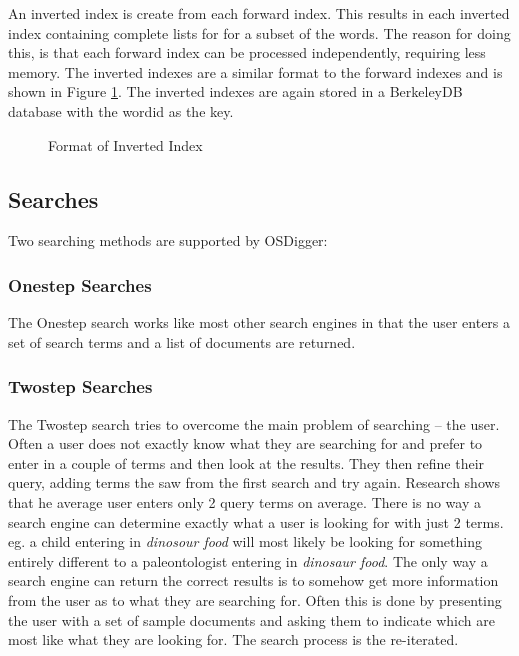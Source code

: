 An inverted index is create from each forward index.  This results in each inverted index containing complete lists for for a subset of the words.  The reason for doing this, is that each forward index can be processed independently, requiring less memory.   The inverted indexes are a similar format to the forward indexes and is shown in Figure \ref{fig:inverted}.  The inverted indexes are again stored in a BerkeleyDB database with the wordid as the key.

\begin{figure}[htbp]
  \begin{center}
    \caption{Format of Inverted Index}
    \label{fig:inverted}
  \end{center}
\end{figure}



\subsection{Searches}
Two searching methods are supported by OSDigger:
\subsubsection{Onestep Searches}
The Onestep search works like most other search engines in that the user enters a set of search terms and a list of documents are returned.


\subsubsection{Twostep Searches}
The Twostep search tries to overcome the main problem of searching -- the user.  Often a user does not exactly know what they are searching for and prefer to enter in a couple of terms and then look at the results.  They then refine their query, adding terms the saw from the first search and try again.  Research shows that he average user enters only 2 query terms on average.  There is no way a search engine can determine exactly what a user is looking for with just 2 terms. eg. a child entering in \emph{dinosour food} will most likely be looking for something entirely different to a paleontologist entering in \emph{dinosaur food}.  The only way a search engine can return the correct results is to somehow get more information from the user as to what they are searching for.  Often this is done by presenting the user with a set of sample documents and asking them to indicate which are most like what they are looking for.  The search process is the re-iterated.

